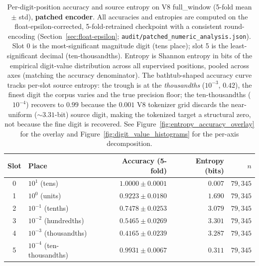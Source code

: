 \begin{table}[ht]
\centering
\caption{Per-digit-position accuracy and source entropy on V8 full\_window (5-fold mean $\pm$ std), \textbf{patched encoder}. All accuracies and entropies are computed on the float-epsilon-corrected, 5-fold-retrained checkpoint with a consistent round-encoding (Section~\ref{sec:float-epsilon}; \texttt{audit/patched\_numeric\_analysis.json}). Slot 0 is the most-significant magnitude digit (tens place); slot 5 is the least-significant decimal (ten-thousandths). Entropy is Shannon entropy in bits of the empirical digit-value distribution across all supervised positions, pooled across axes (matching the accuracy denominator). The bathtub-shaped accuracy curve tracks per-slot source entropy: the trough is at the \emph{thousandths} ($10^{-3}$, $0.42$), the finest digit the corpus varies and the true precision floor; the ten-thousandths ($10^{-4}$) recovers to $0.99$ because the $0.001$ V8 tokenizer grid discards the near-uniform ($\sim\!3.31$-bit) source digit, making the tokenized target a structural zero, not because the fine digit is recovered. See Figure~\ref{fig:entropy_accuracy_overlay} for the overlay and Figure~\ref{fig:digit_value_histograms} for the per-axis decomposition.}
\label{tab:per_digit_position}
\begin{tabular}{c l r r r}
\toprule
Slot & Place & Accuracy (5-fold) & Entropy (bits) & $n$ \\
\midrule
0 & $10^{1}$ (tens) & $1.0000 \pm 0.0001$ & $0.007$ & $79,345$ \\
1 & $10^{0}$ (units) & $0.9223 \pm 0.0180$ & $1.690$ & $79,345$ \\
2 & $10^{-1}$ (tenths) & $0.7478 \pm 0.0253$ & $3.079$ & $79,345$ \\
3 & $10^{-2}$ (hundredths) & $0.5465 \pm 0.0269$ & $3.301$ & $79,345$ \\
4 & $10^{-3}$ (thousandths) & $0.4165 \pm 0.0239$ & $3.287$ & $79,345$ \\
5 & $10^{-4}$ (ten-thousandths) & $0.9931 \pm 0.0067$ & $0.311$ & $79,345$ \\

\end{tabular}
\end{table}
